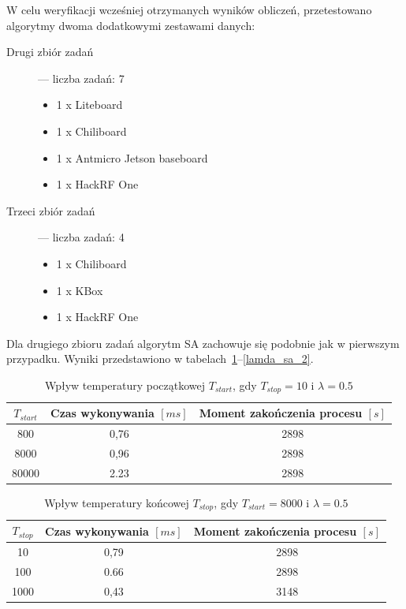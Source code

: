\breakparagraph{}
W celu weryfikacji wcześniej otrzymanych wyników obliczeń, przetestowano algorytmy dwoma dodatkowymi zestawami danych:
\begin{description}
	\item[Drugi zbiór zadań] --- liczba zadań: 7
	\begin{itemize}
		\item 1 x Liteboard
		\item 1 x Chiliboard
		\item 1 x Antmicro Jetson baseboard
		\item 1 x HackRF One
	\end{itemize}
	\item[Trzeci zbiór zadań] --- liczba zadań: 4
	\begin{itemize}
		\item 1 x Chiliboard
		\item 1 x KBox
		\item 1 x HackRF One
	\end{itemize}
\end{description}

\breakparagraph{}
Dla drugiego zbioru zadań algorytm SA zachowuje się podobnie jak w pierwszym przypadku. Wyniki przedstawiono w tabelach~\ref{tstart_sa_2}--\ref{lamda_sa_2}.

\begin{table}[H]
	\centering
	\caption{Wpływ temperatury początkowej $T_{start}$, gdy $T_{stop}=10$ i $\lambda=0.5$}
	\label{tstart_sa_2}
	\begin{tabular}{ccc}
		\toprule
		$T_{start}$ & Czas wykonywania $[ms]$ & Moment zakończenia procesu $[s]$ \\
		\midrule
		800         & 0,76                    & 2898                              \\
		8000        & 0,96                    & 2898                              \\
		80000       & 2.23                    & 2898                              \\
		\bottomrule
	\end{tabular}
\end{table}

\begin{table}[H]
	\centering
	\label{tstop_sa_2}
	\caption{Wpływ temperatury końcowej $T_{stop}$, gdy $T_{start}=8000$ i $\lambda=0.5$}
	\begin{tabular}{ccc}
		\toprule
		$T_{stop}$ & Czas wykonywania $[ms]$ & Moment zakończenia procesu $[s]$ \\
		\midrule
		10         & 0,79                    & 2898                              \\
		100        & 0.66                    & 2898                              \\
		1000       & 0,43                    & 3148                              \\
		\bottomrule
	\end{tabular}
\end{table}


